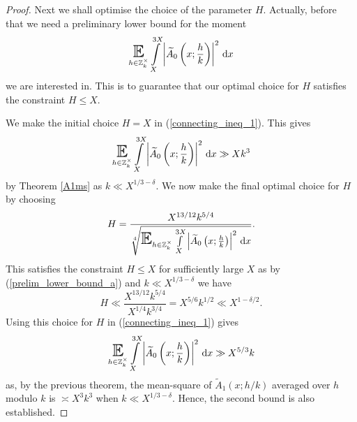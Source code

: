 \documentclass[a4paper,10pt,twoside]{amsart}
\theoremstyle{definition}
\numberwithin{equation}{section}
\newcommand\E{\mathbb{E}}
\renewcommand\:{\colon}
\begin{document}
\begin{proof}
Next we shall optimise the choice of the parameter $H$. Actually, before that we need a preliminary lower bound for the moment 
\begin{align*}
\mathop{\text{\LARGE$\E$}}_{h\in\mathbb Z_k^\times}\int\limits_X^{3X}\left|\widetilde A_0\left(x;\frac hk\right)\right|^2\,\mathrm dx
\end{align*}
we are interested in. This is to guarantee that our optimal choice for $H$ satisfies the constraint $H\leq X$.

We make the initial choice $H=X$ in (\ref{connecting_ineq_1}). This gives
\begin{align}\label{prelim_lower_bound_a}
\mathop{\text{\LARGE$\E$}}_{h\in\mathbb Z_k^\times}\int\limits_X^{3X}\left|\widetilde A_0\left(x;\frac hk\right)\right|^2\,\mathrm dx\gg Xk^3
\end{align}
by Theorem \ref{A1ms} as $k\ll X^{1/3-\delta}$. We now make the final optimal choice for $H$ by choosing
\[ 
H=\frac{X^{13/12}k^{5/4}}{\sqrt[4]{\mathop{\text{\LARGE$\E$}}_{h\in\mathbb Z_k^\times}\int\limits_X^{3X}\left|\widetilde A_0\left(x;\frac hk\right)\right|^2\,\mathrm dx}}.\]
This satisfies the constraint $H\leq X$ for sufficiently large $X$ as by (\ref{prelim_lower_bound_a}) and $k\ll X^{1/3-\delta}$ we have 
\[ 
H\ll\frac{X^{13/12}k^{5/4}}{X^{1/4}k^{3/4}}=X^{5/6}k^{1/2}\ll X^{1-\delta/2}.
\]
Using this choice for $H$ in (\ref{connecting_ineq_1}) gives 
\[ 
\mathop{\text{\LARGE$\E$}}_{h\in\mathbb Z_k^\times}\int\limits_X^{3X}\left|\widetilde A_0\left(x;\frac hk\right)\right|^2\,\mathrm dx\gg X^{5/3}k\]
as, by the previous theorem, the mean-square of $\widetilde A_1(x;h/k)$ averaged over $h$ modulo $k$ is $\asymp X^3k^3$ when $k\ll X^{1/3-\delta}$. Hence, the second bound is also established. 
\end{proof}
\end{document}

